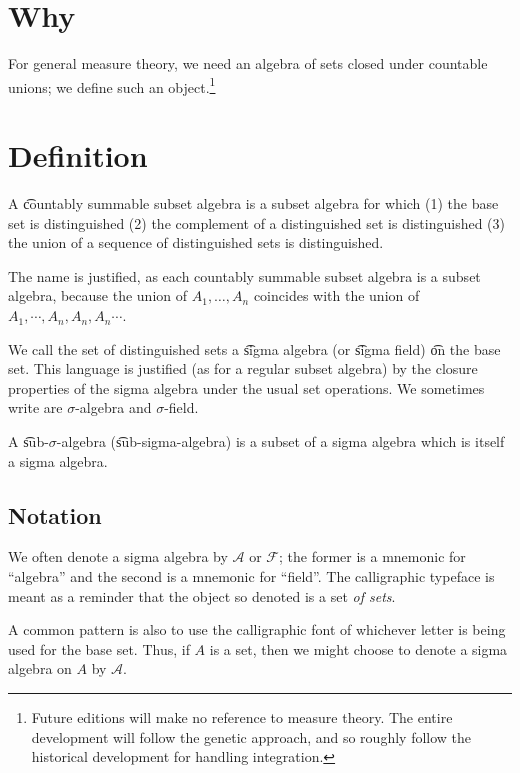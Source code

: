 
\section*{Why}

For general measure theory, we need an algebra of sets closed under countable unions; we define such an object.\footnote{Future editions will make no reference to measure theory. The entire development will follow the genetic approach, and so roughly follow the historical development for handling integration.}

\section*{Definition}

A \t{countably summable subset algebra} is a subset algebra for which (1) the base set is distinguished (2) the complement of a distinguished set is distinguished (3) the union of a sequence of distinguished sets is distinguished.

The name is justified, as each countably summable subset algebra is a subset algebra, because the union of $A_1, \dots , A_n$ coincides with the union of $A_1, \cdots, A_n, A_n, A_n \cdots$.

We call the set of distinguished sets a \t{sigma algebra} (or \t{sigma field}) \t{on} the base set.
This language is justified (as for a regular subset algebra) by the closure properties of the sigma algebra under the usual set operations.
We sometimes write are $\sigma $-algebra and $\sigma $-field.

A \t{sub-$\sigma $-algebra} (\t{sub-sigma-algebra}) is a subset of a sigma algebra which is itself a sigma algebra.

\subsection*{Notation}



We often denote a sigma algebra by $\mathcal{A} $ or $\mathcal{F} $; the former is a mnemonic for ``algebra'' and the second is a mnemonic for ``field''.
The calligraphic typeface is meant as a reminder that the object so denoted is a set \textit{of sets}.

A common pattern is also to use the calligraphic font of whichever letter is being used for the base set.
Thus, if $A$ is a set, then we might choose to denote a sigma algebra on $A$ by $\mathcal{A} $.


